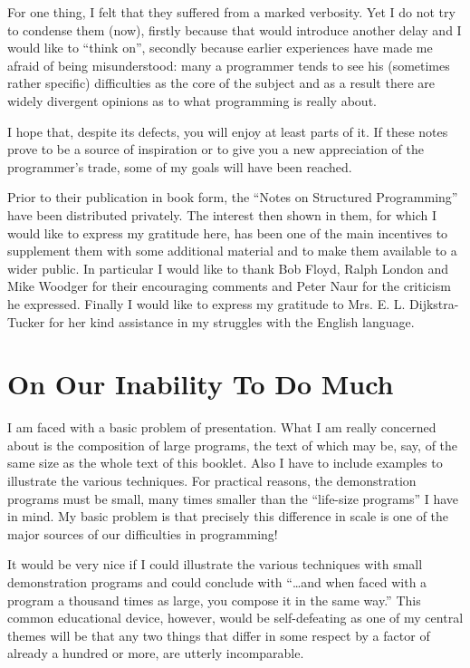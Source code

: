 \documentclass[twoside,11pt]{book}
\begin{document}
For one thing, I felt that they suffered from a marked verbosity. Yet I do not try to condense them (now), firstly because that would introduce another delay and I would like to ``think on'', secondly because earlier experiences have made me afraid of being misunderstood: many a programmer tends to see his (sometimes rather specific) difficulties as the core of the subject and as a result there are widely divergent opinions as to what programming is really about.

I hope that, despite its defects, you will enjoy at least parts of it. If these notes prove to be a source of inspiration or to give you a new appreciation of the programmer's trade, some of my goals will have been reached.

Prior to their publication in book form, the ``Notes on Structured Programming'' have been distributed privately. The interest then shown in
them, for which I would like to express my gratitude here, has been one of the main incentives to supplement them with some additional material and to make them available to a wider public. In particular I would like to thank Bob Floyd, Ralph London and Mike Woodger for their encouraging
comments and Peter Naur for the criticism he expressed. Finally I would like to express my gratitude to Mrs. E. L. Dijkstra-Tucker for her kind
assistance in my struggles with the English language.

\section[On our inability to do much]{On Our Inability To Do Much}
\label{sec:our-inability-to-do-much}

I am faced with a basic problem of presentation. What I am really concerned about is the composition of large programs, the text of which may be, say, of the same size as the whole text of this booklet. Also I have to include examples to illustrate the various techniques. For practical reasons, the demonstration programs must be small, many times smaller than the ``life-size programs'' I have in mind. My basic problem is that precisely this difference in scale is one of the major sources of our difficulties in programming!

It would be very nice if I could illustrate the various techniques with small demonstration programs and could conclude with ``\dots and when faced with a program a thousand times as large, you compose it in the same way.'' This common educational device, however, would be self-defeating as one of my central themes will be that any two things that differ in some respect by a factor of already a hundred or more, are utterly incomparable.
\end{document}
